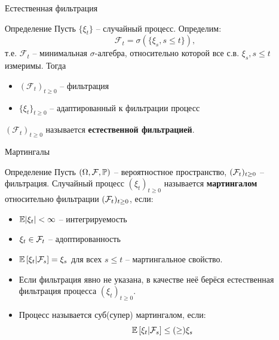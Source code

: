 \documentclass{beamer}
\begin{document}
\begin{frame}{Естественная фильтрация}
    \begin{block}{Определение}
        Пусть $\{\xi_t\}$ -- случайный процесс. Определим:
        $$
            \mathcal{F}_t = \sigma(\{\xi_s, s \leq t\}),
        $$т.е. $\mathcal{F}_t$ -- минимальная $\sigma$-алгебра, относительно которой все с.в. $\xi_s, s\leq t$ измеримы. Тогда 
        \begin{itemize}
            \item $\left(\mathcal{F}_t\right)_{t\geq 0}$ -- фильтрация
            \item $\{\xi_t\}_{t\geq 0}$ -- адаптированный к фильтрации процесс
        \end{itemize}
        $\left(\mathcal{F}_t\right)_{t\geq 0}$ называется \textbf{естественной фильтрацией}.    
    \end{block}

\end{frame}

\begin{frame}{Мартингалы}
    \begin{block}{Определение}
        Пусть $(\Omega, \mathcal{F}, \mathbb{P})$ -- вероятностное пространство, $(\mathcal{F}_t)_{t\geq 0}$ -- фильтрация. Случайный процесс $(\xi_t)_{t\geq 0}$ называется \textbf{мартингалом} относительно фильтрации $(\mathcal{F}_t)_{t\geq 0}$, если:
        \begin{itemize}
            \item $\mathbb{E} |\xi_t| < \infty$ -- интегрируемость
            \item $\xi_t \in \mathcal{F}_t$ -- адоптированность
            \item $\mathbb{E} \left[ \xi_t | \mathcal{F}_s\right] = \xi_s$ для всех $s\leq t$ -- мартингальное свойство.
        \end{itemize}
    \end{block}
    \begin{itemize}
        \item Если фильтрация явно не указана, в качестве неё берёся естественная фильтрация процесса $(\xi_t)_{t\geq 0}$.
        \item Процесс называется суб(супер) мартингалом, если:
    $$
        \mathbb{E} \left[ \xi_t | \mathcal{F}_s\right] \leq (\geq) \xi_s
    $$
    \end{itemize}
    


\end{frame}
\end{document}
